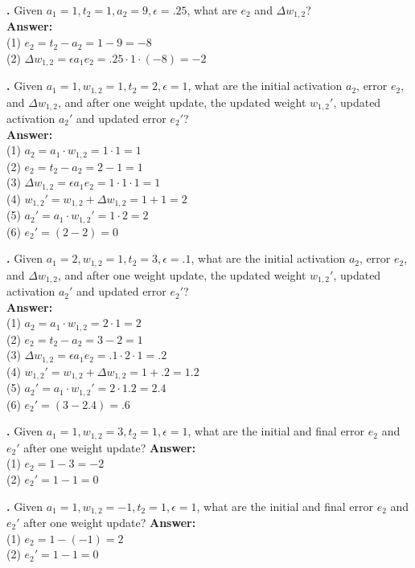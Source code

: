 \noindent
{}
{\bf \theLMSCounter.}  Given $a_1 = 1, t_2 = 1, a_2 = 9, \epsilon = .25$, what are $e_2$ and $\Delta w_{1,2}$? \\
{\bf Answer:}  \\
(1) $e_2 = t_2 - a_2 = 1 - 9 = -8 $ \\
(2) $\Delta w_{1,2} = \epsilon a_1 e_2 =  .25 \cdot 1 \cdot (-8)  = -2$
\bigskip





\noindent
{}
{\bf \theLMSCounter.}  Given $a_1 = 1, w_{1,2} = 1, t_2 = 2,\epsilon = 1$, what are the initial activation $a_2$, error $e_2$, and $\Delta w_{1,2}$, and after one weight update, the updated weight $w_{1,2}'$, updated activation  $a_2'$ and updated error $e_2'$? \\
{\bf Answer:}  \\
(1) $a_2 = a_1 \cdot w_{1,2} = 1 \cdot 1 = 1$ \\
(2) $e_2 = t_2 - a_2 = 2 - 1 = 1 $ \\
(3) $\Delta w_{1,2} = \epsilon a_1 e_2 = 1 \cdot 1 \cdot 1 = 1$ \\
(4) $w_{1,2}' = w_{1,2} + \Delta w_{1,2}  = 1 + 1 = 2$\\
(5) $a_2' =  a_1 \cdot w_{1,2}' = 1 \cdot 2 = 2$\\
(6) $e_2' = (2-2) = 0$
\bigskip

\noindent
{}
{\bf \theLMSCounter.}  Given $a_1 = 2, w_{1,2} = 1, t_2 = 3 ,\epsilon = .1$, what are the initial activation $a_2$, error $e_2$, and $\Delta w_{1,2}$, and after one weight update, the updated weight $w_{1,2}'$, updated activation  $a_2'$ and updated error $e_2'$? \\
{\bf Answer:}  \\
(1) $a_2 = a_1 \cdot w_{1,2} = 2 \cdot 1 = 2$ \\
(2) $e_2 = t_2 - a_2 = 3 - 2 = 1 $ \\
(3) $\Delta w_{1,2} = \epsilon a_1 e_2 = .1 \cdot 2 \cdot 1 = .2$ \\
(4) $w_{1,2}' = w_{1,2} + \Delta w_{1,2}  = 1 + .2 = 1.2$\\
(5) $a_2' =  a_1 \cdot w_{1,2}' = 2 \cdot 1.2 = 2.4$\\
(6) $e_2' = (3 - 2.4) = .6$
\bigskip

\noindent
{}
{\bf \theLMSCounter.}  Given $a_1 = 1, w_{1,2} = 3, t_2 = 1 ,\epsilon = 1$, what are the initial and final error $e_2$ and $e_2'$ after one weight update? 
{\bf Answer:}  \\
(1) $e_2 =  1 - 3  = -2 $ \\
(2) $e_2' = 1 - 1 = 0$
\bigskip

\noindent
{}
{\bf \theLMSCounter.}  Given $a_1 = 1, w_{1,2} = -1, t_2 = 1 ,\epsilon = 1$, what are the initial and final error $e_2$ and $e_2'$ after one weight update? 
{\bf Answer:}  \\
(1) $e_2 =  1 - (-1)  = 2 $ \\
(2) $e_2' = 1 - 1 = 0$
\bigskip


